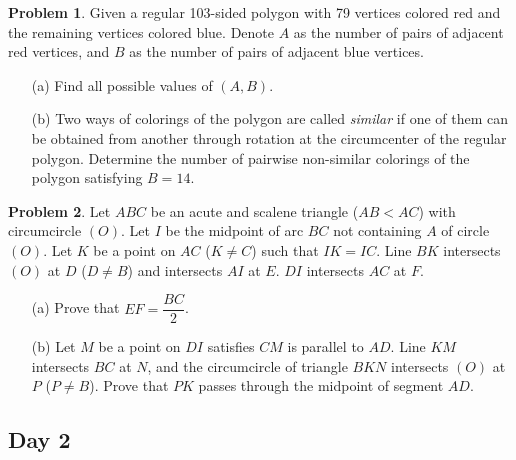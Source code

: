 \documentclass[11pt]{article}
\theoremstyle{definition}
\newtheorem{exercise}{Problem}
\newcommand{\boom}{\vspace{0.25cm}}
\begin{document}
        \begin{exercise}
            Given a regular 103-sided polygon with 79 vertices colored red and the remaining vertices colored blue. Denote \(A\) as the number of pairs of adjacent red vertices, and \(B\) as the number of pairs of adjacent blue vertices.
            \begin{enumerate}
                \item[(a)] Find all possible values of \((A,B)\).
                \item[(b)] Two ways of colorings of the polygon are called \emph{similar} if one of them can be obtained from another through rotation at the circumcenter of the regular polygon. Determine the number of pairwise non-similar colorings of the polygon satisfying \(B = 14\).
            \end{enumerate}
        \end{exercise}
    
        \boom
    
        \begin{exercise}
            Let \(ABC\) be an acute and scalene triangle (\(AB < AC\)) with circumcircle \((O)\). Let \(I\) be the midpoint of arc \(BC\) not containing \(A\) of circle \((O)\). Let \(K\) be a point on \(AC\) (\(K \neq C\)) such that \(IK = IC\). Line \(BK\) intersects \((O)\) at \(D\) (\(D \neq B\)) and intersects \(AI\) at \(E\). \(DI\) intersects \(AC\) at \(F\).
            \begin{enumerate}
                \item[(a)] Prove that \(EF = \dfrac{BC}{2}\).
                \item[(b)] Let \(M\) be a point on \(DI\) satisfies \(CM\) is parallel to \(AD\). Line \(KM\) intersects \(BC\) at \(N\), and the circumcircle of triangle \(BKN\) intersects \((O)\) at \(P\) (\(P \neq B\)). Prove that \(PK\) passes through the midpoint of segment \(AD\).
            \end{enumerate}
        \end{exercise}

    \newpage
    
    \subsection*{Day 2}
\end{document}
